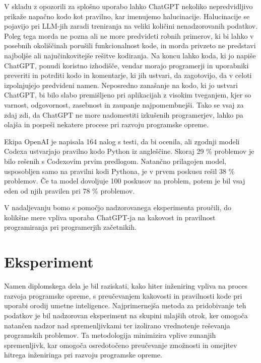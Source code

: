 \documentclass[a4paper,12pt,openright]{book}
\begin{document}
V skladu z opozorili za splošno uporabo lahko ChatGPT nekoliko nepredvidljivo prikaže napačno kodo kot pravilno, kar imenujemo halucinacije. Halucinacije se pojavijo pri LLM-jih zaradi treniranja na veliki količini nenadzorovanih podatkov. \cite{alkaissi2023artificial} \\
Poleg tega morda ne pozna ali ne more predvideti robnih primerov, ki bi lahko v posebnih okoliščinah porušili funkcionalnost kode, in morda privzeto ne predstavi najboljše ali najučinkovitejše rešitve kodiranja. Na koncu lahko koda, ki jo napiše ChatGPT, ponudi koristno izhodišče, vendar morajo programerji in uporabniki preveriti in potrditi kodo in komentarje, ki jih ustvari, da zagotovijo, da v celoti izpolnjujejo predvideni namen. Neposredno zanašanje na kodo, ki jo ustvari ChatGPT, bi bilo slabo premišljeno pri aplikacijah z visokim tveganjem, kjer so varnost, odgovornost, zasebnost in zaupanje najpomembnejši. Tako se vsaj za zdaj zdi, da ChatGPT ne more nadomestiti izkušenih programerjev, lahko pa olajša in pospeši nekatere procese pri razvoju programske opreme.
\cite{Meyer2023}

Ekipa OpenAI je napisala 164 nalog s testi, da bi ocenila, ali
zgodnji modeli Codexa ustvarjajo pravilno kodo Python iz angleščine. Skoraj 29 \% problemov je bilo rešenih s Codexovim prvim predlogom. 
Natančno prilagojen model, usposobljen samo na pravilni kodi Pythona,
je v prvem poskusu rešil 38 \% problemov. Če ta model
dovoljuje 100 poskusov na problem, potem je bil vsaj eden od njih
pravilen pri 78 \% problemov. \cite{DBLP:journals/corr/abs-2107-03374}

V nadaljevanju bomo s pomočjo nadzorovanega eksperimenta proučili, do kolikšne mere vpliva uporaba ChatGPT-ja na kakovost in pravilnost programiranja pri programerjih začetnikih.


\chapter{Eksperiment}

Namen diplomskega dela je bil raziskati, kako hiter inženiring vpliva na proces razvoja programske opreme, s preučevanjem kakovosti in pravilnosti kode pri uporabi orodij umetne inteligence. Najprimernejša metoda za pridobivanje teh podatkov je bil nadzorovan eksperiment na skupini mlajših otrok, ker omogoča natančen nadzor nad spremenljivkami ter izolirano vrednotenje reševanja programskih problemov. Ta metodologija minimizira vplive zunanjih spremenljivk, kar omogoča osredotočeno preučevanje zmožnosti in omejitev hitrega inženiringa pri razvoju programske opreme.
\end{document}
